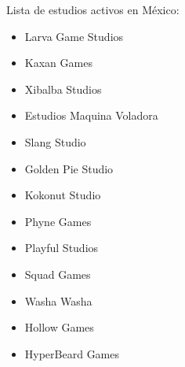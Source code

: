 Lista de estudios activos en México:
\begin{itemize}
	\item Larva Game Studios
	\item Kaxan Games
	\item Xibalba Studios
	\item Estudios Maquina Voladora
	\item Slang Studio
	\item Golden Pie Studio
	\item Kokonut Studio
	\item Phyne Games
	\item Playful Studios
	\item Squad Games
	\item Washa Washa
	\item Hollow Games
	\item HyperBeard Games
	
\end{itemize}
